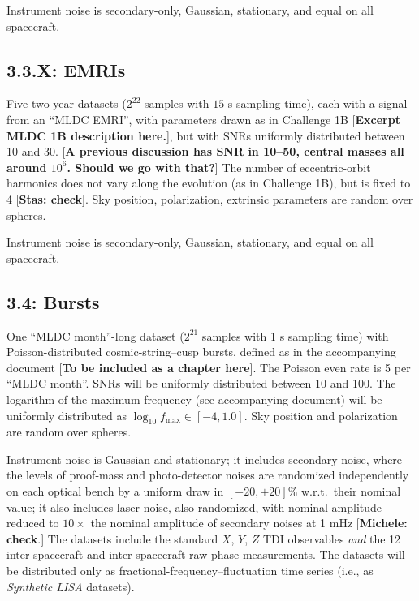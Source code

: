\documentclass[11pt]{article}
\begin{document}
Instrument noise is secondary-only, Gaussian, stationary, and equal on all spacecraft. 

\subsection*{3.3.X: EMRIs}

Five two-year datasets ($2^{22}$ samples with $15$ s sampling time), each with a signal from an ``MLDC EMRI'', with parameters drawn as in Challenge 1B [\textbf{Excerpt MLDC 1B description here.}], but with SNRs uniformly distributed between 10 and 30. [\textbf{A previous discussion has SNR in 10--50, central masses all around $10^6$. Should we go with that?}] The number of eccentric-orbit harmonics does not vary along the evolution (as in Challenge 1B), but is fixed to 4 [\textbf{Stas: check}]. Sky position, polarization, extrinsic parameters are random over spheres.

Instrument noise is secondary-only, Gaussian, stationary, and equal on all spacecraft. 

\subsection*{3.4: Bursts}

One ``MLDC month''-long dataset ($2^{21}$ samples with 1 s sampling time) with Poisson-distributed cosmic-string--cusp bursts, defined as in the accompanying document [\textbf{To be included as a chapter here}]. The Poisson even rate is 5 per ``MLDC month''. SNRs will be uniformly distributed between 10 and 100. The logarithm of the maximum frequency (see accompanying document) will be uniformly distributed as $\log_10 f_\mathrm{max} \in [-4,1.0]$. Sky position and polarization are random over spheres.

Instrument noise is Gaussian and stationary; it includes secondary noise, where the levels of proof-mass and photo-detector noises are randomized independently on each optical bench by a uniform draw in $[-20,+20]\%$ w.r.t.\ their nominal value; it also includes laser noise, also randomized, with nominal amplitude reduced to $10\times$ the nominal amplitude of secondary noises at 1 mHz [\textbf{Michele: check}.] The datasets include the standard $X$, $Y$, $Z$ TDI observables \emph{and} the 12 inter-spacecraft and inter-spacecraft raw phase measurements. The datasets will be distributed only as fractional-frequency--fluctuation time series (i.e., as \emph{Synthetic LISA} datasets).
\end{document}
